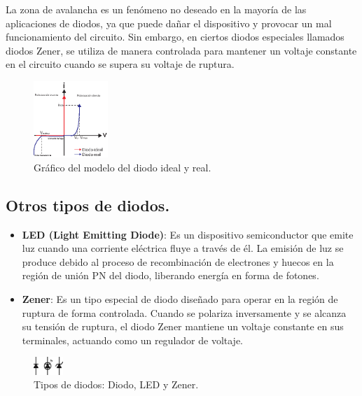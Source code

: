 \documentclass[isoft]{ssltexposter}
\begin{document}
\begin{poster}
La zona de avalancha es un fenómeno no deseado en la mayoría de las aplicaciones de diodos, ya que puede dañar el dispositivo y provocar un mal funcionamiento del circuito. Sin embargo, en ciertos diodos especiales llamados diodos Zener, se utiliza de manera controlada para mantener un voltaje constante en el circuito cuando se supera su voltaje de ruptura.



\begin{figure}
    \centering
    \includegraphics[width=0.25\textwidth]{imagenes/grafico_diodo.eps}
    \caption{Gráfico del modelo del diodo ideal y real.}
    \label{fig:grafico_diodo}
\end{figure}

\subsection{Otros tipos de diodos.}

\begin{itemize}
    \item \textbf{LED (Light Emitting Diode)}: Es un dispositivo semiconductor que emite luz cuando una corriente eléctrica fluye a través de él. La emisión de luz se produce debido al proceso de recombinación de electrones y huecos en la región de unión PN del diodo, liberando energía en forma de fotones.
    \item \textbf{Zener}: Es un tipo especial de diodo diseñado para operar en la región de ruptura de forma controlada. Cuando se polariza inversamente y se alcanza su tensión de ruptura, el diodo Zener mantiene un voltaje constante en sus terminales, actuando como un regulador de voltaje.
    \end{itemize}

\begin{figure}
    \centering
    \includegraphics[width=0.1\textwidth]{imagenes/tipos_diodos.eps}
    \caption{Tipos de diodos: Diodo, LED y Zener.}
    \label{fig:tipo_diodos}
\end{figure}


\end{poster}
\end{document}

